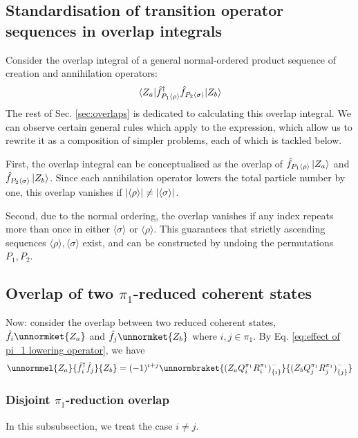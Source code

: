\documentclass[12pt]{article}
\newcommand{\seq}[1]{\langle #1\rangle}
\newcommand{\hc}{^\dagger}
\begin{document}
	\subsection{Standardisation of transition operator sequences in overlap integrals}
	
	Consider the overlap integral of a general normal-ordered product sequence of creation and annihilation operators:
	\begin{equation}
	\mel{Z_a}{\hat{f}\hc_{P_1\seq{\rho}}\hat{f}_{P_2\seq{\sigma}}}{Z_b}
	\end{equation}
	The rest of Sec. \ref{sec:overlaps} is dedicated to calculating this overlap integral. We can observe certain general rules which apply to the expression, which allow us to rewrite it as a composition of simpler problems, each of which is tackled below.
	
	First, the overlap integral can be conceptualised as the overlap of $\hat{f}_{P_1\seq{\rho}}\ket{Z_a}$ and $\hat{f}_{P_2\seq{\sigma}}\ket{Z_b}$. Since each annihilation operator lowers the total particle number by one, this overlap vanishes if $\abs{\seq{\rho}}\neq\abs{\seq{\sigma}}$.
	
	Second, due to the normal ordering, the overlap vanishes if any index repeats more than once in either $\seq{\sigma}$ or $\seq{\rho}$. This guarantees that strictly ascending sequences $\seq{\rho},\seq{\sigma}$ exist, and can be constructed by undoing the permutations $P_1,P_2$.
	
	\subsection{Overlap of two $\pi_1$-reduced coherent states}
	Now: consider the overlap between two reduced coherent states, $\hat{f}_i\unnormket{Z_a}$ and $\hat{f}_j\unnormket{Z_b}$ where $i,j\in \pi_1$. By Eq. \ref{eq:effect of pi_1 lowering operator}, we have
	\begin{equation} \label{eq: overlap of two pi_1 reduced coherent states problem}
	\unnormmel{Z_a}{\hat{f}\hc_i\hat{f}_j}{Z_b}=(-1)^{i+j}\unnormbraket{(Z_aQ^{\pi_1}_iR^{\pi_1}_i)^{-}_{\{i\}}}{(Z_bQ^{\pi_1}_jR^{\pi_1}_j)^{-}_{\{j\}}}
	\end{equation}
	
	\subsubsection{Disjoint $\pi_1$-reduction overlap}
	In this subsubsection, we treat the case $i\neq j$.
	
\end{document}
